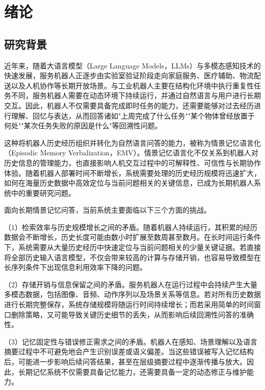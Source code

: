 
\chapter{绪论}

\section{研究背景}

近年来，随着大语言模型（Large Language Models，LLMs）\cite{vaswani2017attention,brown2020gpt3}与多模态感知技术的快速发展，服务机器人正逐步由实验室验证阶段走向家庭服务、医疗辅助、物流配送以及人机协作等长期开放场景。与工业机器人主要在结构化环境中执行重复性任务不同，服务机器人需要在动态环境下持续运行，并通过自然语言与用户进行长期交互。因此，机器人不仅需要具备完成即时任务的能力，还需要能够对过去经历进行理解、回忆与表达，从而回答诸如"上周完成了什么任务""某个物体曾经放置于何处""某次任务失败的原因是什么"等回溯性问题。

这种将机器人历史经历组织并转化为自然语言问答的能力，被称为情景记忆语言化（Episodic Memory Verbalization，EMV）\cite{tulving1972episodic,liu2024hemv}。情景记忆语言化不仅关系到机器人对历史信息的管理能力，也直接影响人机交互过程中的可解释性、可信性与长期协作体验。随着机器人部署时间不断增长，系统需要处理的历史经历规模将迅速扩大，如何在海量历史数据中高效定位与当前问题相关的关键信息，已成为长期机器人系统中的重要研究问题。

面向长期情景记忆问答，当前系统主要面临以下三个方面的挑战。

（1）检索效率与历史规模增长之间的矛盾。随着机器人持续运行，其积累的经历数据会不断增长，历史长度可能由数小时扩展至数周甚至数月。在长时间运行条件下，系统需要从大量历史经历中快速定位与当前问题相关的少量关键证据。若直接将全部历史输入语言模型，不仅会带来较高的计算与存储开销，也容易导致模型在长序列条件下出现信息利用效率下降的问题。

（2）存储开销与信息保留之间的矛盾。服务机器人在运行过程中会持续产生大量多模态数据，包括图像、音频、动作序列以及场景关系等信息。若对所有历史数据进行长期完整保存，系统存储规模将随运行时间持续增长；而若采用简单的时间窗口删除策略，又可能导致关键历史细节的丢失，从而影响后续回溯性问答的准确性。

（3）记忆固定性与错误修正需求之间的矛盾。机器人在感知、场景理解以及语言摘要过程中不可避免地会产生识别误差或语义偏差。当这些错误被写入记忆结构后，可能进一步影响后续问答结果，甚至在层级摘要过程中逐渐传播与放大。因此，长期记忆系统不仅需要具备记忆能力，还需要具备一定的动态修正与维护能力。

